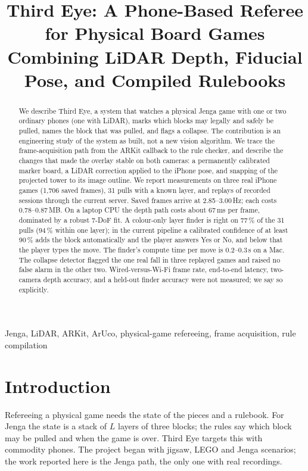 \documentclass[conference,10pt]{IEEEtran}
\begin{document}
\title{Third Eye: A Phone-Based Referee for Physical Board Games Combining LiDAR Depth, Fiducial Pose, and Compiled Rulebooks}
\author{
}
\maketitle

\begin{abstract}
We describe Third Eye, a system that watches a physical Jenga game with one or two ordinary phones (one with LiDAR), marks which blocks may legally and safely be pulled, names the block that was pulled, and flags a collapse. The contribution is an engineering study of the system as built, not a new vision algorithm. We trace the frame-acquisition path from the ARKit callback to the rule checker, and describe the changes that made the overlay stable on both cameras: a permanently calibrated marker board, a LiDAR correction applied to the iPhone pose, and snapping of the projected tower to its image outline. We report measurements on three real iPhone games (1{,}706 saved frames), 31 pulls with a known layer, and replays of recorded sessions through the current server. Saved frames arrive at 2.85--3.00\,Hz; each costs 0.78--0.87\,MB. On a laptop CPU the depth path costs about 67\,ms per frame, dominated by a robust 7-DoF fit. A colour-only layer finder is right on 77\,\% of the 31 pulls (94\,\% within one layer); in the current pipeline a calibrated confidence of at least 90\,\% adds the block automatically and the player answers Yes or No, and below that the player types the move. The finder's compute time per move is 0.2--0.3\,s on a Mac. The collapse detector flagged the one real fall in three replayed games and raised no false alarm in the other two. Wired-versus-Wi-Fi frame rate, end-to-end latency, two-camera depth accuracy, and a held-out finder accuracy were not measured; we say so explicitly.
\end{abstract}
\begin{IEEEkeywords}
Jenga, LiDAR, ARKit, ArUco, physical-game refereeing, frame acquisition, rule compilation
\end{IEEEkeywords}

\section{Introduction}
Refereeing a physical game needs the state of the pieces and a rulebook. For Jenga the state is a stack of $L$ layers of three blocks; the rules say which block may be pulled and when the game is over. Third Eye targets this with commodity phones. The project began with jigsaw, LEGO and Jenga scenarios; the work reported here is the Jenga path, the only one with real recordings.
\end{document}
